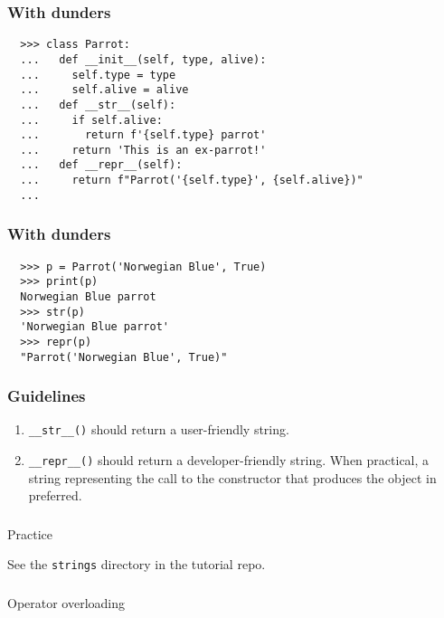 \documentclass[aspectratio=169]{beamer}
\begin{document}
\begin{frame}[fragile]
  \frametitle{With dunders}
  
  \begin{Verbatim}
  >>> class Parrot:
  ...   def __init__(self, type, alive):
  ...     self.type = type
  ...     self.alive = alive
  ...   def __str__(self):
  ...     if self.alive:
  ...       return f'{self.type} parrot'
  ...     return 'This is an ex-parrot!'
  ...   def __repr__(self):
  ...     return f"Parrot('{self.type}', {self.alive})"
  ...
    \end{Verbatim}
 \end{frame}
  
  
\begin{frame}[fragile]
  \frametitle{With dunders}
  
  \begin{Verbatim}
  >>> p = Parrot('Norwegian Blue', True)
  >>> print(p)
  Norwegian Blue parrot
  >>> str(p)
  'Norwegian Blue parrot'
  >>> repr(p)
  "Parrot('Norwegian Blue', True)"  
  \end{Verbatim}
 \end{frame}
  
\begin{frame}
  \frametitle{Guidelines} 
  
   
   
   \begin{enumerate}
     \item \texttt{\_\_str\_\_()} should return a user-friendly string.
     \item \texttt{\_\_repr\_\_()} should return a developer-friendly string. When practical, a string representing the call to the constructor that produces the object in preferred.
   \end{enumerate}  
 \end{frame}
  
\begin{frame}
  \frametitle{} 
   
   \centerline{\huge Practice} 
   \centerline{See the \texttt{strings} directory in the tutorial repo.} 
   
   \end{frame}

\begin{frame}
  \frametitle{} 
  \centerline{\huge Operator overloading}
 \end{frame}
 
\end{document}
